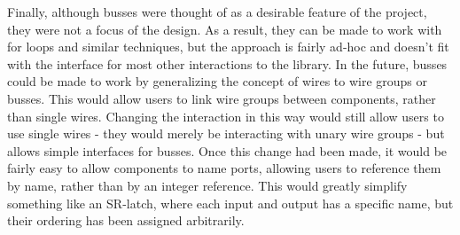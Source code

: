 \documentclass{article}
\begin{document}
Finally, although busses were thought of as a desirable feature of the project, they were not a focus of the design. As a result, they can be made to work with for loops and similar techniques, but the approach is fairly ad-hoc and doesn’t fit with the interface for most other interactions to the library. In the future, busses could be made to work by generalizing the concept of wires to wire groups or busses. This would allow users to link wire groups between components, rather than single wires. Changing the interaction in this way would still allow users to use single wires - they would merely be interacting with unary wire groups - but allows simple interfaces for busses. Once this change had been made, it would be fairly easy to allow components to name ports, allowing users to reference them by name, rather than by an integer reference. This would greatly simplify something like an SR-latch, where each input and output has a specific name, but their ordering has been assigned arbitrarily.



\end{document}

